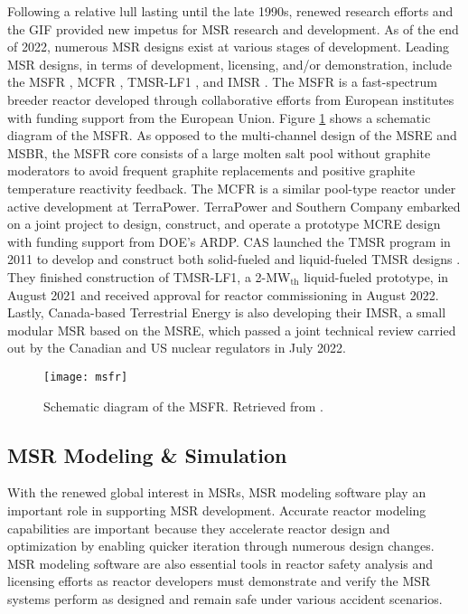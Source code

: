 Following a relative lull lasting until the late 1990s, renewed research efforts and the \gls{GIF}
provided new impetus for \gls{MSR} research and development. As of the end of 2022, numerous
\gls{MSR} designs exist at various stages of development. Leading \gls{MSR} designs, in terms of
development, licensing, and/or demonstration, include the \gls{MSFR} \cite{merle_optimized_2007},
\gls{MCFR} \cite{terrapower_terrapower_2021}, TMSR-LF1 \cite{zhang_review_2018}, and \gls{IMSR}
\cite{leblanc_18_2017}. The \gls{MSFR} is a fast-spectrum breeder reactor developed through
collaborative efforts from European institutes with funding support from the
European Union. Figure \ref{fig:msfr} shows a schematic diagram of the \gls{MSFR}. As opposed to
the multi-channel design of the \gls{MSRE} and \gls{MSBR}, the
\gls{MSFR} core consists of a large molten salt pool without graphite moderators to avoid
frequent graphite replacements and positive graphite temperature reactivity feedback. The
\gls{MCFR} is a similar pool-type reactor under active development at TerraPower. TerraPower and
Southern Company embarked on a joint project to design, construct, and operate a prototype
\gls{MCRE} design with funding support from \gls{DOE}'s \gls{ARDP}. \gls{CAS} launched the
\gls{TMSR} program in 2011 to develop and construct both solid-fueled and liquid-fueled \gls{TMSR}
designs \cite{zou_research_2019}. They finished construction of TMSR-LF1, a 2-MW$_{\text{th}}$
liquid-fueled prototype, in August 2021 and received approval for reactor commissioning in August
2022. Lastly, Canada-based Terrestrial Energy is also developing their \gls{IMSR}, a small modular
\gls{MSR} based on the \gls{MSRE}, which passed a joint technical review carried out by the
Canadian and US nuclear regulators in July 2022.
%
\begin{figure}[htb!]
	\centering
	\texttt{[image: msfr]}
	\caption{Schematic diagram of the \gls{MSFR}. Retrieved from 
	\cite{allibert_7_2016}.}
	\label{fig:msfr}
\end{figure}

\subsection{\gls{MSR} Modeling \& Simulation}

With the renewed global interest in \glspl{MSR}, \gls{MSR} modeling software play an important role
in supporting \gls{MSR} development.
Accurate reactor modeling capabilities are important because they
accelerate reactor design and optimization by enabling quicker iteration through numerous design
changes. \gls{MSR} modeling software are also essential tools in reactor safety analysis and
licensing efforts as reactor developers must demonstrate and verify the \gls{MSR} systems perform
as designed and remain safe under various accident scenarios.

